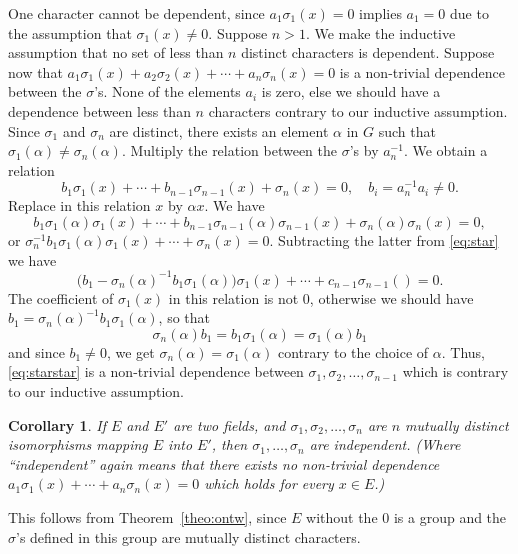 \documentclass[10pt,leqno]{article}
\newtheorem*{coro*}{Corollary}
\theoremstyle{definition}
\begin{document}
One character cannot be dependent, since $a_1 \sigma_1(x) = 0$ implies $a_1 = 0$ due to the assumption that $\sigma_1(x) \not= 0$.
Suppose $n > 1$.
We make the inductive assumption that no set of less than $n$ distinct characters is dependent.
Suppose now that $a_1 \sigma_1(x) + a_2 \sigma_2(x) + \cdots + a_n \sigma_n(x) = 0$ is a non-trivial dependence between the $\sigma$'s.
None of the elements $a_i$ is zero, else we should have a dependence between less than $n$ characters contrary to our inductive assumption.
Since $\sigma_1$ and $\sigma_n$ are distinct, there exists an element $\alpha$ in $G$ such that $\sigma_1(\alpha) \not= \sigma_n(\alpha)$.
Multiply the relation between the $\sigma$'s by $a_n^{-1}$.
We obtain a relation
\begin{equation}
\label{eq:star}
b_1 \sigma_1(x) + \cdots + b_{n-1} \sigma_{n-1}(x) + \sigma_n(x) = 0,
\quad
b_i = a_n^{-1} a_i \not= 0.
\tag{$*$}
\end{equation}
Replace in this relation $x$ by $\alpha x$. We have
\[
b_1 \sigma_1(\alpha) \sigma_1(x) 
+ \cdots 
+ b_{n-1} \sigma_{n-1} (\alpha) \sigma_{n-1}(x) 
+ \sigma_n(\alpha) \sigma_n(x) = 0,
\]
or $\sigma_n^{-1} b_1 \sigma_1(\alpha) \sigma_1(x) + \cdots + \sigma_n(x) = 0$.
Subtracting the latter from \eqref{eq:star} we have
\begin{equation}
\label{eq:starstar}
\bigl(b_1 - \sigma_n(\alpha)^{-1}b_1 \sigma_1(\alpha)\bigr) \sigma_1(x)
+ \cdots
+ c_{n-1} \sigma_{n-1}() = 0.
\tag{$**$}
\end{equation}
The coefficient of $\sigma_1(x)$ in this relation is not 0, otherwise we should have $b_1 = \sigma_n(\alpha)^{-1}b_1\sigma_1(\alpha)$, so that
\[
\sigma_n(\alpha) b_1 = b_1 \sigma_1(\alpha) = \sigma_1(\alpha)b_1
\]
and since $b_1 \not= 0$, we get $\sigma_n(\alpha) = \sigma_1(\alpha)$ contrary to the choice of $\alpha$.
Thus, \eqref{eq:starstar} is a non-trivial dependence between $\sigma_1, \sigma_2, \ldots, \sigma_{n-1}$ which is contrary to our inductive assumption.


\begin{coro*}
If $E$ and $E'$ are two fields, and $\sigma_1, \sigma_2, \ldots, \sigma_n$ are $n$ mutually distinct isomorphisms mapping $E$ into $E'$, then $\sigma_1, \ldots, \sigma_n$ are independent.
(Where ``independent'' again means that there exists no non-trivial dependence $a_1 \sigma_1(x) + \cdots + a_n \sigma_n(x) = 0$ which holds for every $x \in E$.)
\end{coro*}


This follows from Theorem~\ref{theo:ontw}, since $E$ without the 0 is a group and the $\sigma$'s defined in this group are mutually distinct characters.
\end{document}
